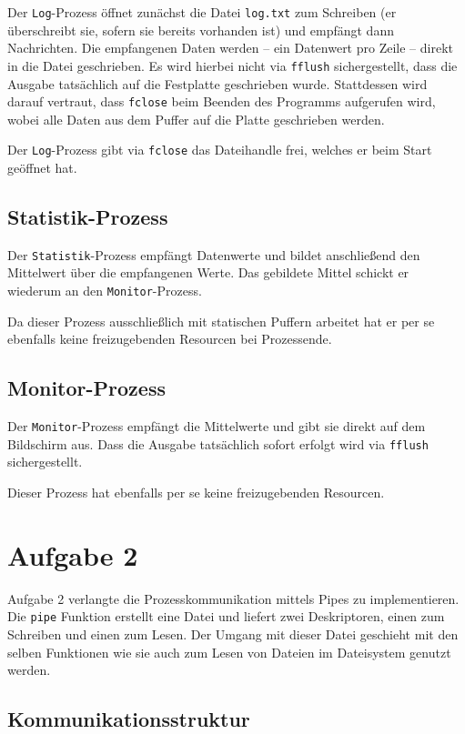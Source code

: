 \documentclass[12pt, a4paper]{scrartcl}
\begin{document}
Der \texttt{Log}-Prozess öffnet zunächst die Datei \texttt{log.txt} zum
Schreiben (er überschreibt sie, sofern sie bereits vorhanden ist) und empfängt
dann Nachrichten. Die empfangenen Daten werden -- ein Datenwert pro Zeile --
direkt in die Datei geschrieben. Es wird hierbei nicht via \texttt{fflush}
sichergestellt, dass die Ausgabe tatsächlich auf die Festplatte geschrieben
wurde. Stattdessen wird darauf vertraut, dass \texttt{fclose} beim Beenden des
Programms aufgerufen wird, wobei alle Daten aus dem Puffer auf die Platte
geschrieben werden.
\np

Der \texttt{Log}-Prozess gibt via \texttt{fclose} das Dateihandle frei, welches
er beim Start geöffnet hat.

\subsection{Statistik-Prozess}

Der \texttt{Statistik}-Prozess empfängt Datenwerte und bildet anschließend
den Mittelwert über die empfangenen Werte. Das gebildete Mittel schickt er
wiederum an den \texttt{Monitor}-Prozess.
\np

Da dieser Prozess ausschließlich mit statischen Puffern arbeitet hat er per se
ebenfalls keine freizugebenden Resourcen bei Prozessende.

\subsection{Monitor-Prozess}

Der \texttt{Monitor}-Prozess empfängt die Mittelwerte und gibt sie direkt auf
dem Bildschirm aus. Dass die Ausgabe tatsächlich sofort erfolgt wird via
\texttt{fflush} sichergestellt.
\np

Dieser Prozess hat ebenfalls per se keine freizugebenden Resourcen.

\clearpage
\section{Aufgabe 2}

Aufgabe 2 verlangte die Prozesskommunikation mittels Pipes zu implementieren.
Die \texttt{pipe} Funktion erstellt eine Datei und liefert zwei Deskriptoren,
einen zum Schreiben und einen zum Lesen. Der Umgang mit dieser Datei geschieht
mit den selben Funktionen wie sie auch zum Lesen von Dateien im Dateisystem
genutzt werden.

\subsection{Kommunikationsstruktur}
\end{document}
